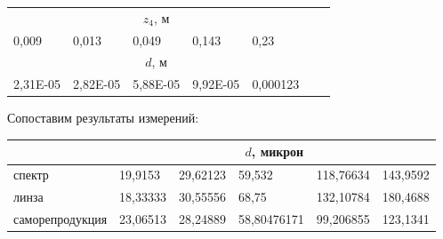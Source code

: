 \documentclass[a4paper,12pt]{article}
\begin{document}
\begin{table}[h!]
\begin{tabular}{cllllll}
		\multicolumn{5}{|c|}{$z_4$, м}                                                                                                                                  &                            &                           \\ \cline{1-5}
		\multicolumn{1}{|l|}{0,009}    & \multicolumn{1}{l|}{0,013}    & \multicolumn{1}{l|}{0,049}    & \multicolumn{1}{l|}{0,143}    & \multicolumn{1}{l|}{0,23}     &                            &                           \\ \cline{1-5}
		\multicolumn{5}{|c|}{$d$, м}                                                                                                                                     &                            &                           \\ \cline{1-5}
		\multicolumn{1}{|l|}{2,31E-05} & \multicolumn{1}{l|}{2,82E-05} & \multicolumn{1}{l|}{5,88E-05} & \multicolumn{1}{l|}{9,92E-05} & \multicolumn{1}{l|}{0,000123} &                            &                           \\ \cline{1-5}
	\end{tabular}
\end{table}

Сопоставим результаты измерений:

\begin{table}[h!]
	\begin{tabular}{l|l|l|l|l|l|}
		\cline{2-6}
		& \multicolumn{5}{c|}{$d$, микрон}                           \\ \hline
		\multicolumn{1}{|l|}{спектр}          & 19,9153  & 29,62123 & 59,532      & 118,76634 & 143,9592 \\ \hline
		\multicolumn{1}{|l|}{линза}           & 18,33333 & 30,55556 & 68,75       & 132,10784 & 180,4688 \\ \hline
		\multicolumn{1}{|l|}{саморепродукция} & 23,06513 & 28,24889 & 58,80476171 & 99,206855 & 123,1341 \\ \hline
	\end{tabular}
\end{table}
\end{document}
